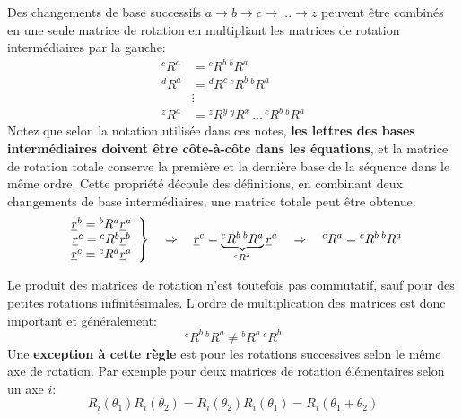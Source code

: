 \begin{property}
Des changements de base successifs $a \rightarrow b \rightarrow c \rightarrow ... \rightarrow z$  peuvent être combinés en une seule matrice de rotation en multipliant les matrices de rotation intermédiaires par la gauche:
\begin{align}
{}^cR^a &=  {}^cR^b \, {}^bR^a \\
{}^dR^a &=  {}^dR^c \, {}^cR^b \, {}^bR^a \\
& \vdots \\
{}^zR^a &=  {}^zR^y \, {}^yR^x \, \hdots \, {}^cR^b \, {}^bR^a 
\end{align}
Notez que selon la notation utilisée dans ces notes, \textbf{les lettres des bases intermédiaires doivent être côte-à-côte dans les équations}, et la matrice de rotation totale conserve la première et la dernière base de la séquence dans le même ordre. Cette propriété découle des définitions, en combinant deux changements de base intermédiaires, une matrice totale peut être obtenue: 
\begin{align}
\left. \begin{array}{c}
\underline{r}^b = {}^bR^a \underline{r}^a \\  \underline{r}^c = {}^cR^b \underline{r}^b \\ \underline{r}^c = {}^cR^a \underline{r}^a 
\end{array} \right\} \quad \Rightarrow \quad \underline{r}^c = \underbrace{{}^cR^b \,  {}^bR^a}_{ {}^cR^a } \underline{r}^a \quad \Rightarrow \quad {}^cR^a  = {}^cR^b \,  {}^bR^a 
\end{align}
\end{property}

\begin{property}
Le produit des matrices de rotation n'est toutefois pas commutatif, sauf pour des petites rotations infinitésimales. L'ordre de multiplication des matrices est donc important et généralement:
\begin{equation}
^cR^b \, ^bR^a \ne {}^bR^a \, ^cR^b
\end{equation} 
Une \textbf{exception à cette règle} est pour les rotations successives selon le même axe de rotation. Par exemple pour deux matrices de rotation élémentaires selon un axe $i$:
\begin{equation}
R_i( \theta_1 ) R_i( \theta_2 )  = R_i( \theta_2 ) R_i( \theta_1 ) = R_i( \theta_1 + \theta_2 )
\end{equation} 
\end{property}


